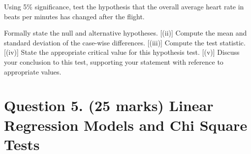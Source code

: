 Using 5\% significance, test the hypothesis that the overall average heart rate
in beats per minutes has changed after the flight. 
\begin{itemize}
[(i)] Formally state the null and alternative hypotheses.
[(ii)]  Compute the mean and standard deviation of the case-wise differences.
[(iii)] Compute the test statistic.
[(iv)] State the appropriate critical value for this hypothesis test.
[(v)] Discuss your conclusion to this test, supporting your statement with reference to appropriate values.
\end{itemize}
%
%	

\newpage

\section*{Question 5. (25 marks) Linear Regression Models and Chi Square Tests }

